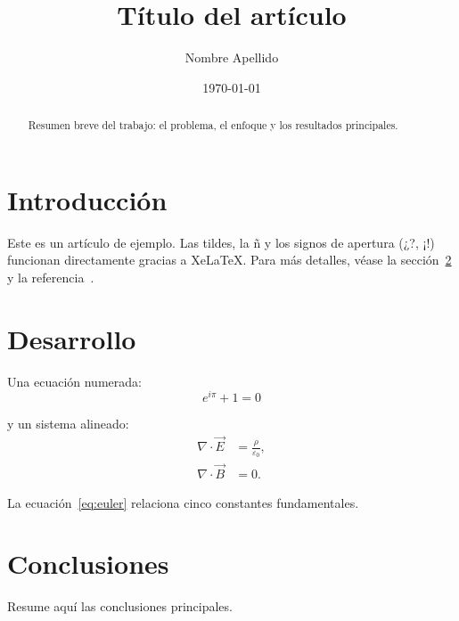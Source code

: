 \documentclass[11pt,a4paper]{article}
\title{Título del artículo}
\author{Nombre Apellido}
\date{\today}
\begin{document}
\maketitle

\begin{abstract}
  Resumen breve del trabajo: el problema, el enfoque y los resultados principales.
\end{abstract}

\section{Introducción}
\label{sec:introduccion}

Este es un artículo de ejemplo. Las tildes, la ñ y los signos de apertura (¿?, ¡!) funcionan
directamente gracias a XeLaTeX. Para más detalles, véase la sección~\ref{sec:desarrollo} y la
referencia~\cite{knuth1984}.

\section{Desarrollo}
\label{sec:desarrollo}

Una ecuación numerada:
\begin{equation}
  \label{eq:euler}
  e^{i\pi} + 1 = 0
\end{equation}

y un sistema alineado:
\begin{align}
  \nabla \cdot \vec{E} &= \frac{\rho}{\varepsilon_0}, \\
  \nabla \cdot \vec{B} &= 0.
\end{align}

La ecuación~\eqref{eq:euler} relaciona cinco constantes fundamentales.

\section{Conclusiones}

Resume aquí las conclusiones principales.



\end{document}
